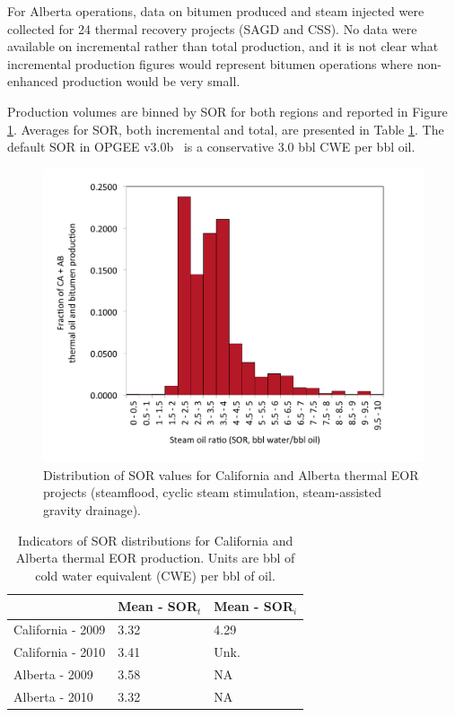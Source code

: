 \documentclass[11pt]{report}
\newcommand{\version}{v3.0b }
\begin{document}
For Alberta operations, data on bitumen produced and steam injected were collected for 24 thermal recovery projects (SAGD and CSS). No data were available on incremental rather than total production, and it is not clear what incremental production figures would represent bitumen operations where non-enhanced production would be very small.

Production volumes are binned by SOR for both regions and reported in Figure \ref{fig:SOR_dist}. Averages for SOR, both incremental and total, are presented in Table \ref{tab:SOR_stats}.  The default SOR in OPGEE \version \, is a conservative 3.0 bbl CWE per bbl oil. 

\begin{figure}[t]
\includegraphics[width=0.85\columnwidth]{images/SOR_dist.pdf}
\caption{Distribution of SOR values for California and Alberta thermal EOR projects (steamflood, cyclic steam stimulation, steam-assisted gravity drainage).}
\label{fig:SOR_dist}
\end{figure}


\begin{table}
\caption{Indicators of SOR distributions for California and Alberta thermal EOR production. Units are bbl of cold water equivalent (CWE) per bbl of oil.}
\label{tab:SOR_stats}
\begin{scriptsize}
\begin{tabularx}{1\columnwidth}{p{}p{}p{}}
\toprule
& Mean - SOR$_t$ & Mean - SOR$_i$ \\
\midrule
California - 2009 & 3.32 & 4.29 \\
California - 2010 & 3.41 & Unk. \\
Alberta - 2009 & 3.58 & NA \\
Alberta - 2010 & 3.32 & NA \\
\bottomrule
\end{tabularx}
\end{scriptsize}
\end{table}
\end{document}
